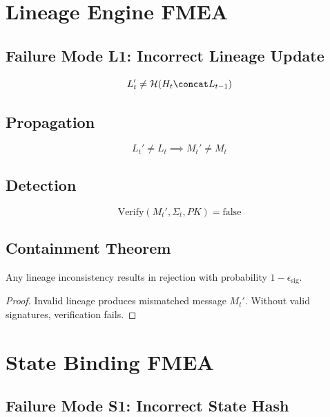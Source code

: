 \section{Lineage Engine FMEA}

\subsection{Failure Mode L1: Incorrect Lineage Update}

\begin{equation}
L_t' \neq \mathcal{H}(H_t \concat L_{t-1})
\end{equation}

\subsection{Propagation}

\begin{equation}
L_t' \neq L_t \implies M_t' \neq M_t
\end{equation}

\subsection{Detection}

\begin{equation}
\text{Verify}(M_t', \Sigma_t, PK) = \text{false}
\end{equation}

\subsection{Containment Theorem}

\begin{theorem}
Any lineage inconsistency results in rejection with probability $1 - \epsilon_{\text{sig}}$.
\end{theorem}

\begin{proof}
Invalid lineage produces mismatched message $M_t'$. Without valid signatures, verification fails.
\end{proof}

\section{State Binding FMEA}

\subsection{Failure Mode S1: Incorrect State Hash}

